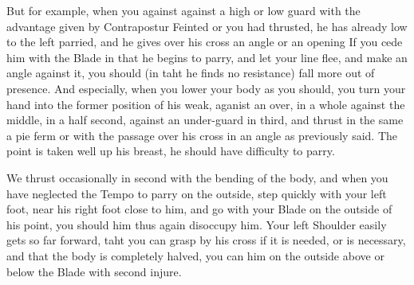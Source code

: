 \newpage


\newpage

But for example, when you against against a high or low guard with the
advantage given by Contrapostur Feinted or you had thrusted, he has
already low to the left parried, and he gives over his cross an angle
or an opening
If you cede him with the Blade in that he begins to parry, and let
your line flee, and make an angle against it, you should (in taht he
finds no resistance) fall more out of presence. And especially, when
you lower your body as you should, you turn your hand into the former
position of his weak, aganist an over, in a whole against the middle,
in a half second, against an under-guard in third, and thrust in the
same a pie ferm or with the passage over his cross in an angle as
previously said. The point is taken well up his breast, he should have
difficulty to parry.

We thrust occasionally in second with the bending of the body, and
when you have neglected the Tempo to parry on the outside, step
quickly with your left foot, near his right foot close to him, and go
with your Blade on the outside of his point, you should him thus again
disoccupy him. Your left Shoulder easily gets so far forward, taht you
can grasp by his cross if it is needed, or is necessary, and that the
body is completely halved, you can him on the outside above or below
the Blade with second injure.

